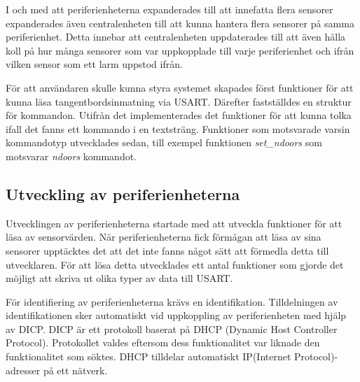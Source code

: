 \documentclass[a4paper]{article}
\begin{document}
I och med att periferienheterna expanderades till att innefatta flera sensorer expanderades även centralenheten till att kunna hantera flera sensorer på samma periferienhet.
Detta innebar att centralenheten uppdaterades till att även hålla koll på hur många sensorer som var uppkopplade till varje periferienhet och ifrån vilken sensor som ett larm uppstod ifrån.

För att användaren skulle kunna styra systemet skapades först funktioner för att kunna läsa tangentbordsinmatning via USART.
Därefter fastställdes en struktur för kommandon. Utifrån det implementerades det funktioner för att kunna tolka ifall det fanns ett kommando i en textsträng.
Funktioner som motsvarade varsin kommandotyp utvecklades sedan, till exempel funktionen \textit{set\_ndoors} som motsvarar \textit{ndoors} kommandot.



\subsection{Utveckling av periferienheterna}
Utvecklingen av periferienheterna startade med att utveckla funktioner för att läsa av sensorvärden.
När periferienheterna fick förmågan att läsa av sina sensorer upptäcktes det att det inte fanns något sätt att förmedla detta till utvecklaren.
För att lösa detta utvecklades ett antal funktioner som gjorde det möjligt att skriva ut olika typer av data till USART.

För identifiering av periferienheterna krävs en identifikation.
Tilldelningen av identifikationen sker automatiskt vid uppkoppling av periferienheten med hjälp av DICP.
DICP är ett protokoll baserat på DHCP (Dynamic Host Controller Protocol).
Protokollet valdes eftersom dess funktionalitet var liknade den funktionalitet som söktes.
DHCP tilldelar automatiskt IP(Internet Protocol)-adresser på ett nätverk.
\end{document}
